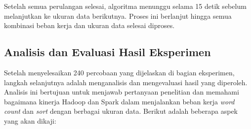 Setelah semua perulangan selesai, algoritma menunggu selama 15 detik sebelum melanjutkan ke ukuran data berikutnya. Proses ini berlanjut hingga semua kombinasi beban kerja dan ukuran data selesai diproses.

\subsection{Analisis dan Evaluasi Hasil Eksperimen}

Setelah menyelesaikan 240 percobaan yang dijelaskan di bagian eksperimen, langkah selanjutnya adalah menganalisis dan mengevaluasi hasil yang diperoleh. Analisis ini bertujuan untuk menjawab pertanyaan penelitian dan memahami bagaimana kinerja Hadoop dan Spark dalam menjalankan beban kerja \textit{word count} dan \textit{sort} dengan berbagai ukuran data. Berikut adalah beberapa aspek yang akan dikaji:

